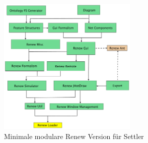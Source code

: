 	\begin{figure}[h!]
	  \centering
	  \includegraphics[width=0.6\textwidth]{material/images/settler-renew-tree-extend.pdf}
	  \caption{Minimale modulare Renew Version für Settler}
	  \label{fig:renew_mulan_plugins}
	\end{figure}	

